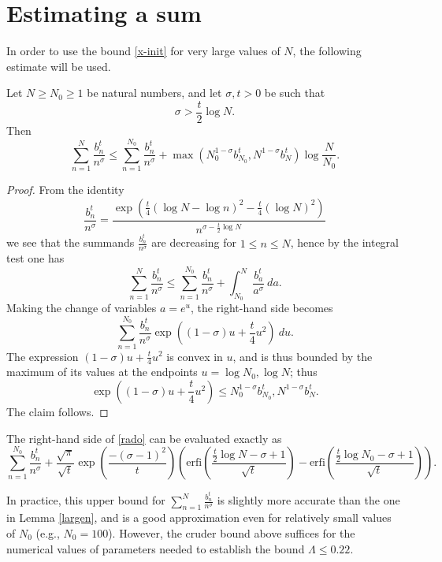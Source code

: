 \section{Estimating a sum}

In order to use the bound \eqref{x-init} for very large values of $N$, the following estimate will be used.

\begin{lemma}\label{largen}
Let $N \geq N_0 \geq 1$ be natural numbers, and let $\sigma,t > 0$ be such that
$$ \sigma > \frac{t}{2} \log N.$$
Then
$$ \sum_{n=1}^N \frac{b_n^t}{n^\sigma} \leq \sum_{n=1}^{N_0}
\frac{b_n^t}{n^\sigma}  + 
\max( N_0^{1-\sigma} b_{N_0}^t, N^{1-\sigma} b_N^t ) \log \frac{N}{N_0}.$$
\end{lemma}

\begin{proof}  From the identity
$$ \frac{b_n^t}{n^\sigma} = \frac{\exp\left( \frac{t}{4} (\log N - \log n)^2 - \frac{t}{4} (\log N)^2\right) }{n^{\sigma - \frac{t}{2} \log N}}$$
we see that the summands $\frac{b_n^t}{n^\sigma}$ are decreasing for $1 \leq n \leq N$, hence by the integral test one has
\begin{equation}\label{rado}
 \sum_{n=1}^N \frac{b_n^t}{n^\sigma} \leq \sum_{n=1}^{N_0}
\frac{b_n^t}{n^\sigma}  + \int_{N_0}^N \frac{b_a^t}{a^\sigma}\ da.
\end{equation}
Making the change of variables $a = e^u$, the right-hand side becomes
$$\sum_{n=1}^{N_0} \frac{b_n^t}{n^\sigma} \exp( (1-\sigma) u + \frac{t}{4} u^2 )\ du.$$
The expression $(1-\sigma) u + \frac{t}{4} u^2$ is convex in $u$, and is thus bounded by the maximum of its values at the endpoints $u = \log N_0, \log N$; thus
$$\exp( (1-\sigma) u + \frac{t}{4} u^2) \leq N_0^{1-\sigma} b_{N_0}^t, N^{1-\sigma} b_N^t.$$
The claim follows. 
\end{proof}

\begin{remark}  The right-hand side of \eqref{rado} can be evaluated exactly as
$$
\sum_{n=1}^{N_0}
\frac{b_n^t}{n^\sigma}  + \frac{\sqrt \pi}{\sqrt t} \exp(\frac{-(\sigma - 1)^2}{t}) \left( \textrm{erfi}(\frac{\frac{t}{2} \log N  - \sigma + 1}{\sqrt t} ) - \textrm{erfi}(\frac{\frac{t}{2} \log N_0  - \sigma + 1}{\sqrt t}) \right).$$

In practice, this upper bound for $\sum_{n=1}^N \frac{b_n^t}{n^\sigma}$ is slightly more accurate than the one in Lemma \ref{largen}, and is a good approximation even for relatively small values of $N_0$ (e.g., $N_0=100$).  However, the cruder bound above suffices for the numerical values of parameters needed to establish the bound $\Lambda \leq 0.22$.
\end{remark}


